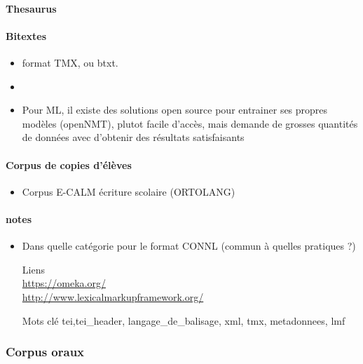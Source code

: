 \documentclass{book}
\newenvironment{titlemize}[1]{%
  \paragraph{#1}
  \begin{itemize}}
  {\end{itemize}}
\begin{document}
\begin{enumerate}
\begin{enumerate}
\begin{titlemize}{Thesaurus}
        \end{titlemize}
        \begin{titlemize}{Bitextes}
            \item format TMX, ou btxt.
            \item 
            \item Pour ML, il existe des solutions open source pour entrainer ses propres modèles (openNMT), plutot facile d'accès, mais demande de grosses quantités de données avec d'obtenir des résultats satisfaisants
        \end{titlemize}
        \begin{titlemize}{Corpus de copies d'élèves}
            \item  Corpus E-CALM écriture scolaire (ORTOLANG)
        \end{titlemize}
        \begin{titlemize}{notes}
            \item Dans quelle catégorie pour le format CONNL (commun à quelles pratiques ?)
        \end{titlemize}
        \end{enumerate}
        
\end{enumerate}

\begin{itemize}
    \item [Liens]
        \autocite{mangeot:hal-00959229}\\
        \url{https://omeka.org/}\\
        \url{http://www.lexicalmarkupframework.org/}\\
    \item [Mots clé]
        \gls{tei},\gls{tei_header}, \gls{langage_de_balisage}, \gls{xml}, \gls{tmx}, \gls{metadonnees}, \gls{lmf}
\end{itemize}

\subsubsection{Corpus oraux}
\end{document}
